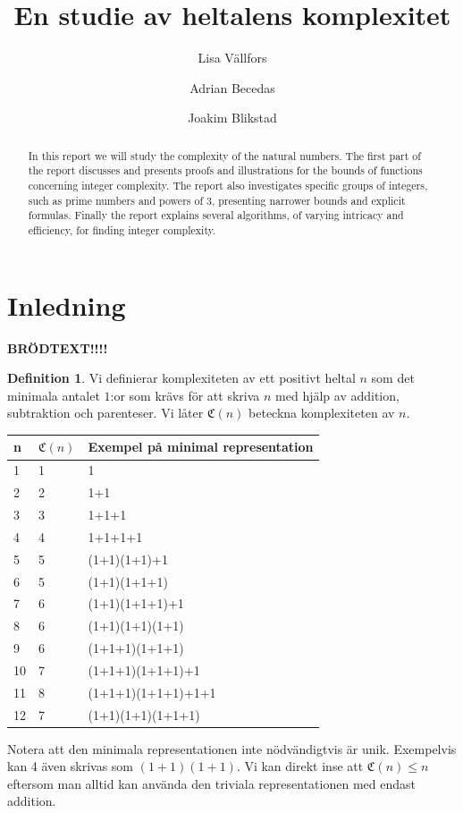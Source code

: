 \documentclass[a4paper,titlepage]{article}
\title{En studie av heltalens komplexitet}
\author{Lisa Vällfors \and Adrian Becedas \and Joakim Blikstad}
\newcommand{\C}[1]{\mathfrak C \left( #1 \right)}
\newcommand{\FIX}[1]{{\color{red} \bf #1}}
\theoremstyle{definition}
\newtheorem{definition}{Definition}
\begin{document}
\maketitle
{}
\begin{abstract}
    In this report we will study the complexity of the natural numbers. 
    The first part of the report discusses and presents proofs and illustrations for the bounds of functions
    concerning integer complexity.
    The report also investigates specific groups of integers, such as prime numbers and
    powers of 3, presenting narrower bounds and explicit formulas.
    Finally the report explains several algorithms, of varying intricacy and efficiency, for finding integer
    complexity.
    
\end{abstract}

\tableofcontents 
\newpage

\section{Inledning}
    
    \FIX{BRÖDTEXT!!!!}

    \begin{definition}
       Vi definierar komplexiteten av ett positivt heltal $n$ som det minimala
       antalet $1$:or som krävs för att skriva $n$ med hjälp av addition,
       subtraktion och parenteser. Vi låter $\C{n}$ beteckna komplexiteten av
       $n$. 
    \end{definition}
    \begin{center}
 \begin{tabular}{| l | l | l | }
    \hline
    n & $\C{n}$ & Exempel på minimal representation  \\ \hline
    1 & 1 & 1  \\ \hline
    2 & 2 & 1+1  \\ \hline
    3 & 3 & 1+1+1  \\ \hline
    4 & 4 & 1+1+1+1  \\ \hline
    5 & 5 & (1+1)(1+1)+1  \\ \hline
    6 & 5 & (1+1)(1+1+1)  \\ \hline
    7 & 6 & (1+1)(1+1+1)+1  \\ \hline
    8 & 6 & (1+1)(1+1)(1+1)  \\ \hline
    9 & 6 & (1+1+1)(1+1+1)  \\ \hline
    10 & 7 & (1+1+1)(1+1+1)+1  \\ \hline
    11 & 8 & (1+1+1)(1+1+1)+1+1  \\ \hline
    12 & 7 & (1+1)(1+1)(1+1+1)  \\
    \hline
    \end{tabular}
\end{center}
    Notera att den minimala representationen inte nödvändigtvis är unik.
    Exempelvis kan 4 även skrivas som $(1+1)(1+1)$. Vi kan direkt inse att $\C{n} \le n$
    eftersom man alltid kan använda den triviala representationen med endast addition.
\end{document}

